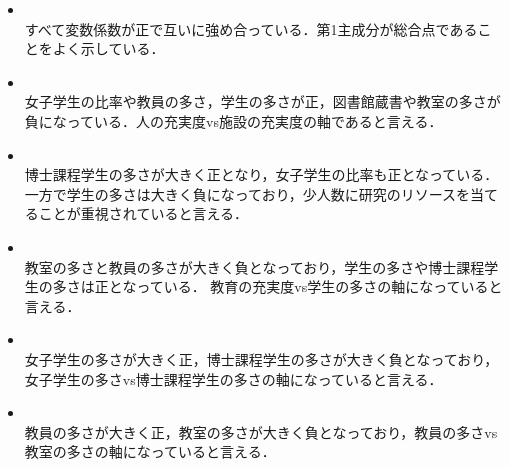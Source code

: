 \documentclass[dvipdfmx,autodetect-engine,titlepage]{jsarticle}
\begin{document}
  \begin{itemize}
    \item  {}\\
    すべて変数係数が正で互いに強め合っている．第1主成分が総合点であることをよく示している．
    \item  {}\\
    女子学生の比率や教員の多さ，学生の多さが正，図書館蔵書や教室の多さが負になっている．人の充実度vs施設の充実度の軸であると言える．
    \item {}\\
    博士課程学生の多さが大きく正となり，女子学生の比率も正となっている．一方で学生の多さは大きく負になっており，少人数に研究のリソースを当てることが重視されていると言える．
    \item {}\\
    教室の多さと教員の多さが大きく負となっており，学生の多さや博士課程学生の多さは正となっている．
    教育の充実度vs学生の多さの軸になっていると言える．
    \item {}\\
    女子学生の多さが大きく正，博士課程学生の多さが大きく負となっており，女子学生の多さvs博士課程学生の多さの軸になっていると言える．
    \item {}\\
    教員の多さが大きく正，教室の多さが大きく負となっており，教員の多さvs教室の多さの軸になっていると言える．\\\\
\end{itemize}

\\
\end{document}
